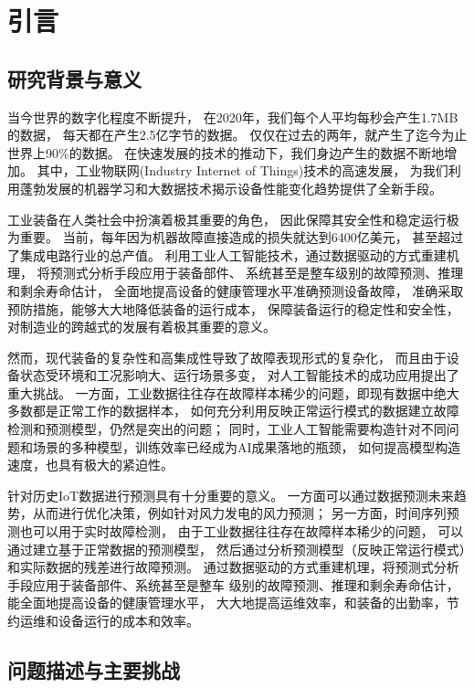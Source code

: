 ﻿%

\chapter{引言}\label{chapter1}

\section{研究背景与意义}
当今世界的数字化程度不断提升，
在2020年，我们每个人平均每秒会产生1.7MB的数据，
每天都在产生2.5亿字节的数据。
仅仅在过去的两年，就产生了迄今为止世界上90\%的数据\cite{siegel2013predictive}。
在快速发展的技术的推动下，我们身边产生的数据不断地增加。
其中，工业物联网(Industry Internet of Things)技术的高速发展，
为我们利用蓬勃发展的机器学习和大数据技术揭示设备性能变化趋势提供了全新手段。

工业装备在人类社会中扮演着极其重要的角色，
因此保障其安全性和稳定运行极为重要。
当前，每年因为机器故障直接造成的损失就达到6400亿美元\cite{isa}，
甚至超过了集成电路行业的总产值。
利用工业人工智能技术，通过数据驱动的方式重建机理，
将预测式分析手段应用于装备部件、
系统甚至是整车级别的故障预测、推理和剩余寿命估计，
全面地提高设备的健康管理水平准确预测设备故障，
准确采取预防措施，能够大大地降低装备的运行成本，
保障装备运行的稳定性和安全性，
对制造业的跨越式的发展有着极其重要的意义。


然而，现代装备的复杂性和高集成性导致了故障表现形式的复杂化，
而且由于设备状态受环境和工况影响大、运行场景多变，
对人工智能技术的成功应用提出了重大挑战。
一方面，工业数据往往存在故障样本稀少的问题，即现有数据中绝大多数都是正常工作的数据样本，
如何充分利用反映正常运行模式的数据建立故障检测和预测模型，仍然是突出的问题；
同时，工业人工智能需要构造针对不同问题和场景的多种模型，训练效率已经成为AI成果落地的瓶颈，
如何提高模型构造速度，也具有极大的紧迫性。


针对历史IoT数据进行预测具有十分重要的意义。
一方面可以通过数据预测未来趋势，从而进行优化决策，例如针对风力发电的风力预测；
另一方面，时间序列预测也可以用于实时故障检测，
由于工业数据往往存在故障样本稀少的问题，
可以通过建立基于正常数据的预测模型，
然后通过分析预测模型（反映正常运行模式）和实际数据的残差进行故障预测。
通过数据驱动的方式重建机理，将预测式分析手段应用于装备部件、系统甚至是整车
级别的故障预测、推理和剩余寿命估计，能全面地提高设备的健康管理水平，
大大地提高运维效率，和装备的出勤率，节约运维和设备运行的成本和效率。

\section{问题描述与主要挑战}
